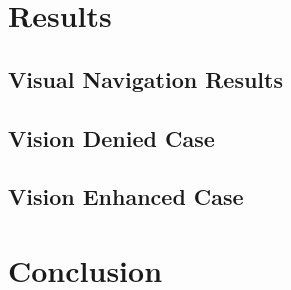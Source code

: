 \documentclass[conference]{IEEEtran}
\begin{document}
\section{Results}

\subsection{Visual Navigation Results}

\subsection{Vision Denied Case}

\subsection{Vision Enhanced Case}



\section{Conclusion}







\end{document}
